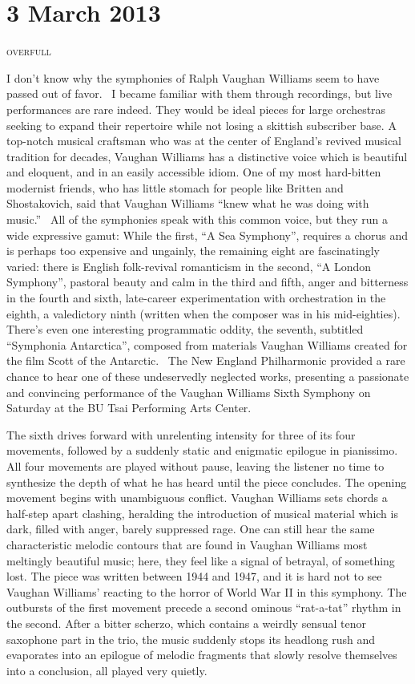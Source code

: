 \chapter{3 March 2013}

\textsc{overfull}

I don’t know why the symphonies of Ralph Vaughan Williams seem to have passed out of favor.  I became familiar with them through recordings, but live performances are rare indeed. They would be ideal pieces for large orchestras seeking to expand their repertoire while not losing a skittish subscriber base. A top-notch musical craftsman who was at the center of England’s revived musical tradition for decades, Vaughan Williams has a distinctive voice which is beautiful and eloquent, and in an easily accessible idiom. One of my most hard-bitten modernist friends, who has little stomach for people like Britten and Shostakovich, said that Vaughan Williams “knew what he was doing with music.”  All of the symphonies speak with this common voice, but they run a wide expressive gamut: While the first, “A Sea Symphony”, requires a chorus and is perhaps too expensive and ungainly, the remaining eight are fascinatingly varied: there is English folk-revival romanticism in the second, “A London Symphony”, pastoral beauty and calm in the third and fifth, anger and bitterness in the fourth and sixth, late-career experimentation with orchestration in the eighth, a valedictory ninth (written when the composer was in his mid-eighties). There’s even one interesting programmatic oddity, the seventh, subtitled “Symphonia Antarctica”, composed from materials Vaughan Williams created for the film Scott of the Antarctic.  The New England Philharmonic provided a rare chance to hear one of these undeservedly neglected works, presenting a passionate and convincing performance of the Vaughan Williams Sixth Symphony on Saturday at the BU Tsai Performing Arts Center.

The sixth drives forward with unrelenting intensity for three of its four movements, followed by a suddenly static and enigmatic epilogue in pianissimo. All four movements are played without pause, leaving the listener no time to synthesize the depth of what he has heard until the piece concludes. The opening movement begins with unambiguous conflict. Vaughan Williams sets chords a half-step apart clashing, heralding the introduction of musical material which is dark, filled with anger, barely suppressed rage. One can still hear the same characteristic melodic contours that are found in Vaughan Williams most meltingly beautiful music; here, they feel like a signal of betrayal, of something lost. The piece was written between 1944 and 1947, and it is hard not to see Vaughan Williams’ reacting to the horror of World War II in this symphony. The outbursts of the first movement precede a second ominous “rat-a-tat” rhythm in the second. After a bitter scherzo, which contains a weirdly sensual tenor saxophone part in the trio, the music suddenly stops its headlong rush and evaporates into an epilogue of melodic fragments that slowly resolve themselves into a conclusion, all played very quietly.

